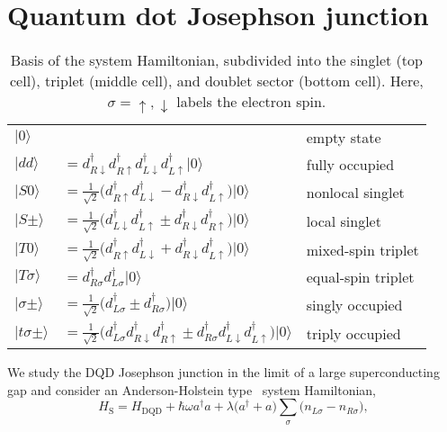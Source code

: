 \documentclass[aps,prb,twocolumn,superscriptaddress,amsmath,amssymb,longbibliography]{revtex4-1}
\newcommand{\ket}[1]{\ensuremath{|#1\rangle}}
\newcommand{\up}{{\uparrow}}
\newcommand{\down}{{\downarrow}}
\begin{document}
	\section{Quantum dot Josephson junction}%
	\begin{table}[t] 
		\begin{ruledtabular}
			\begin{tabular}{lll}
				$\ket{0}$ & & empty state \\
				$\ket{dd}$ & $=d_{R\downarrow}^\dag  d_{R\uparrow}^\dag d_{L\downarrow}^\dag  d_{L\uparrow}^\dag \ket{0}$
				& fully occupied\\
				$\ket{S0}$ & $=\frac{1}{\sqrt{2}} \big( 
				d^\dag_{R\uparrow} d^\dag_{L\downarrow} 
				-d^\dag_{R\downarrow} d^\dag_{L\uparrow}
				\big)\ket{0}$ & nonlocal singlet\\
				$\ket{S\pm}\!$ & $=\frac{1}{\sqrt{2}} \big( 
				d^\dag_{L\downarrow} d^\dag_{L\uparrow} 
				\pm d^\dag_{R\downarrow} d^\dag_{R\uparrow}
				\big)\ket{0}$ & local singlet\\
				\hline
				$\ket{T0}$ & $=\frac{1}{\sqrt{2}}\big( 
				d^\dag_{R\uparrow} d^\dag_{L\downarrow}
				+d^\dag_{R\downarrow} d^\dag_{L\uparrow}
				\big)\ket{0}$ & mixed-spin triplet\\
				$\ket{T\sigma}$ & $=d^\dag_{R\sigma} d^\dag_{L\sigma}\ket{0}$ & equal-spin triplet\\
				\hline
				$\ket{\sigma\pm}$ & $=\frac{1}{\sqrt{2}}\big( 
				d^\dag_{L\sigma}\pm d^\dag_{R\sigma}
				\big)\ket{0}$& singly occupied\\
				$\ket{t\sigma\pm}\!$ & $=\frac{1}{\sqrt{2}}\big( 
				d^\dag_{L\sigma}d^\dag_{R\downarrow}d^\dag_{R\uparrow}
				\pm d^\dag_{R\sigma}d^\dag_{L\downarrow}d^\dag_{L\uparrow}
				\big)\ket{0}$& triply occupied
			\end{tabular}
		\end{ruledtabular}
		\caption{\label{tab.:basis}%
		Basis of the system Hamiltonian, subdivided into the singlet (top cell), triplet (middle cell), and doublet sector (bottom cell). 
		Here, $\sigma=\up,\down$ labels the electron spin.
		}
	\end{table}
	We study the DQD Josephson junction in the limit of a large superconducting gap and consider an Anderson-Holstein type~\cite{HolsteinAP1959a,AndersonPR1961a,HusseinPRB2010a,MetelmannPRB2011a}  system Hamiltonian,
	\begin{equation}
		H_{\textrm{S}}= H_{\textrm{DQD}} +\hbar\omega a^\dag a 
		+\lambda\big(a^\dag +a\big)\sum_{\sigma}\big(n_{L\sigma}-n_{R\sigma}\big), \label{eq.:HS}
	\end{equation}
\end{document}
